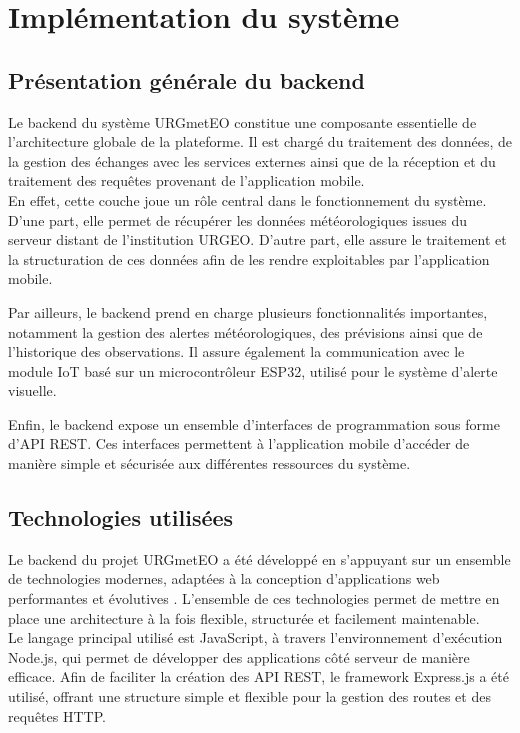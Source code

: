 \chapter{Implémentation du système}

\section{Présentation générale du backend}

\noindent Le backend du système URGmetEO constitue une composante essentielle de l’architecture globale de la plateforme. Il est chargé du traitement des données, de la gestion des échanges avec les services externes ainsi que de la réception et du traitement des requêtes provenant de l’application mobile.\\

\noindent En effet, cette couche joue un rôle central dans le fonctionnement du système. D’une part, elle permet de récupérer les données météorologiques issues du serveur distant de l’institution URGEO. D’autre part, elle assure le traitement et la structuration de ces données afin de les rendre exploitables par l’application mobile.

\noindent Par ailleurs, le backend prend en charge plusieurs fonctionnalités importantes, notamment la gestion des alertes météorologiques, des prévisions ainsi que de l’historique des observations. Il assure également la communication avec le module IoT basé sur un microcontrôleur ESP32, utilisé pour le système d’alerte visuelle.

\noindent Enfin, le backend expose un ensemble d’interfaces de programmation sous forme d’API REST. Ces interfaces permettent à l’application mobile d’accéder de manière simple et sécurisée aux différentes ressources du système.


\section{Technologies utilisées}


\noindent Le backend du projet URGmetEO a été développé en s’appuyant sur un ensemble de technologies modernes, adaptées à la conception d’applications web performantes et évolutives . L’ensemble de ces technologies permet de mettre en place une architecture à la fois flexible, structurée et facilement maintenable.\\

\noindent Le langage principal utilisé est JavaScript, à travers l’environnement d’exécution Node.js, qui permet de développer des applications côté serveur de manière efficace. Afin de faciliter la création des API REST, le framework Express.js a été utilisé, offrant une structure simple et flexible pour la gestion des routes et des requêtes HTTP.\\


